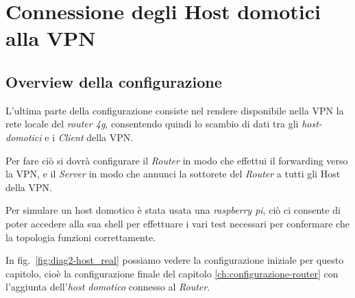 
\chapter{Connessione degli Host domotici alla VPN}
\label{ch:connessione-host-domotici}

\section{Overview della configurazione}

L'ultima parte della configurazione consiste nel rendere disponibile nella VPN la rete locale del \textit{router 4g}, consentendo quindi lo scambio di dati tra gli \textit{host-domotici} e i \textit{Client} della VPN.

Per fare ciò si dovrà configurare il \textit{Router} in modo che effettui il forwarding verso la VPN, e il \textit{Server} in modo che annunci la sottorete del \textit{Router} a tutti gli Host della VPN.


Per simulare un host domotico è stata usata una \textit{raspberry pi}, ciò ci consente di poter accedere alla sua shell per effettuare i vari test necessari per confermare che la topologia funzioni correttamente. 

In fig.~\ref{fig:diag2-host_real} possiamo vedere la configurazione iniziale per questo capitolo, cioè la configurazione finale del capitolo \ref{ch:configurazione-router} con l'aggiunta dell'\textit{host domotico} connesso al \textit{Router}. 


